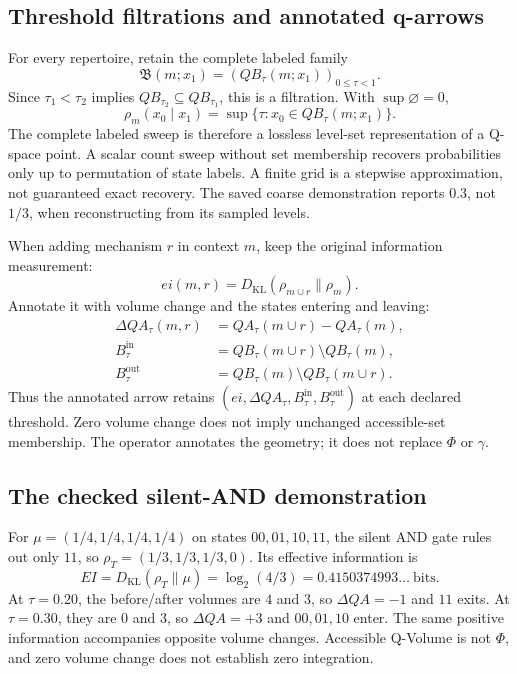 \documentclass[11pt,a4paper]{article}
\begin{document}
\subsection{Threshold filtrations and annotated q-arrows}
For every repertoire, retain the complete labeled family
\begin{equation}
\mathfrak B(m;x_1)=\left(QB_\tau(m;x_1)\right)_{0\leq\tau<1}.
\end{equation}
Since $\tau_1<\tau_2$ implies $QB_{\tau_2}\subseteq QB_{\tau_1}$, this is a filtration. With $\sup\varnothing=0$,
\begin{equation}
\rho_m(x_0\mid x_1)=\sup\{\tau:x_0\in QB_\tau(m;x_1)\}.
\end{equation}
The complete labeled sweep is therefore a lossless level-set representation of a Q-space point. A scalar count sweep without set membership recovers probabilities only up to permutation of state labels. A finite grid is a stepwise approximation, not guaranteed exact recovery. The saved coarse demonstration reports $0.3$, not $1/3$, when reconstructing from its sampled levels.

When adding mechanism $r$ in context $m$, keep the original information measurement:
\begin{equation}
ei(m,r)=D_{\mathrm{KL}}(\rho_{m\cup r}\|\rho_m).
\end{equation}
Annotate it with volume change and the states entering and leaving:
\begin{align}
\Delta QA_\tau(m,r)&=QA_\tau(m\cup r)-QA_\tau(m),\\
B_\tau^{\mathrm{in}}&=QB_\tau(m\cup r)\setminus QB_\tau(m),\\
B_\tau^{\mathrm{out}}&=QB_\tau(m)\setminus QB_\tau(m\cup r).
\end{align}
Thus the annotated arrow retains $(ei,\Delta QA_\tau,B_\tau^{\mathrm{in}},B_\tau^{\mathrm{out}})$ at each declared threshold. Zero volume change does not imply unchanged accessible-set membership. The operator annotates the geometry; it does not replace $\Phi$ or $\gamma$.

\subsection{The checked silent-AND demonstration}
For $\mu=(1/4,1/4,1/4,1/4)$ on states $00,01,10,11$, the silent AND gate rules out only $11$, so $\rho_T=(1/3,1/3,1/3,0)$. Its effective information is
\begin{equation}
EI=D_{\mathrm{KL}}(\rho_T\|\mu)=\log_2(4/3)=0.4150374993\ldots\ \text{bits}.
\end{equation}
At $\tau=0.20$, the before/after volumes are $4$ and $3$, so $\Delta QA=-1$ and $11$ exits. At $\tau=0.30$, they are $0$ and $3$, so $\Delta QA=+3$ and $00,01,10$ enter. The same positive information accompanies opposite volume changes. Accessible Q-Volume is not $\Phi$, and zero volume change does not establish zero integration.
\end{document}
